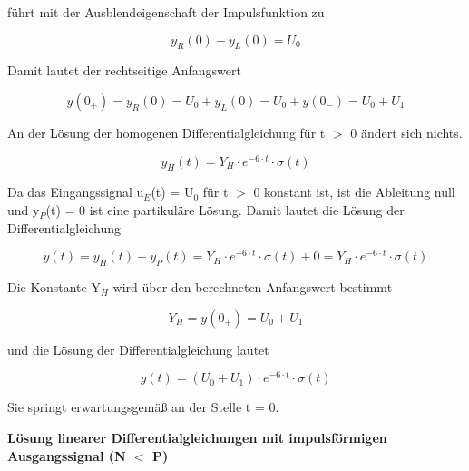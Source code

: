 \noindent f\"{u}hrt mit der Ausblendeigenschaft der Impulsfunktion zu 

\begin{equation}\label{eq:hundredseventeen}
y_{R} \left(0\right)-y_{L} \left(0\right)=U_{0}
\end{equation}

\noindent Damit lautet der rechtseitige Anfangswert 

\begin{equation}\label{eq:hundredeighteen}
y\left(0_{+} \right)=y_{R} \left(0\right)=U_{0} +y_{L} \left(0\right)=U_{0} +y\left(0_{-} \right)=U_{0} +U_{1} 
\end{equation}

\noindent An der L\"{o}sung der homogenen Differentialgleichung f\"{u}r t $\mathrm{>}$ 0 \"{a}ndert sich nichts.

\begin{equation}\label{eq:hundrednineteen}
y_{H} \left(t\right)=Y_{H} \cdot e^{-6\cdot t} \cdot \sigma \left(t\right)
\end{equation}

\noindent Da das Eingangssignal u${}_{E}$(t) = U${}_{0}$ f\"{u}r t $\mathrm{>}$ 0 konstant ist, ist die Ableitung null und y${}_{P}$(t) = 0 ist eine partikul\"{a}re L\"{o}sung. Damit lautet die L\"{o}sung der Differentialgleichung

\begin{equation}\label{eq:hundredtwenty}
y\left(t\right)=y_{H} \left(t\right)+y_{P} \left(t\right)=Y_{H} \cdot e^{-6\cdot t} \cdot \sigma \left(t\right)+0=Y_{H} \cdot e^{-6\cdot t} \cdot \sigma \left(t\right)
\end{equation}

\noindent Die Konstante Y${}_{H}$ wird \"{u}ber den berechneten Anfangswert bestimmt 

\begin{equation}\label{eq:hundredtwentyone}
Y_{H} =y\left(0_{+} \right)=U_{0} +U_{1}
\end{equation}

\noindent und die L\"{o}sung der Differentialgleichung lautet 

\begin{equation}\label{eq:hundredtwentytwo}
y\left(t\right)=\left(U_{0} +U_{1} \right)\cdot e^{-6\cdot t} \cdot \sigma \left(t\right)
\end{equation}

\noindent Sie springt erwartungsgem\"{a}{\ss} an der Stelle t = 0. \bigskip

{\selectfont
\noindent\textbf{Lösung linearer Differentialgleichungen mit impulsförmigen Ausgangssignal (N $\boldsymbol{\mathrm{<}}$ P)}}

